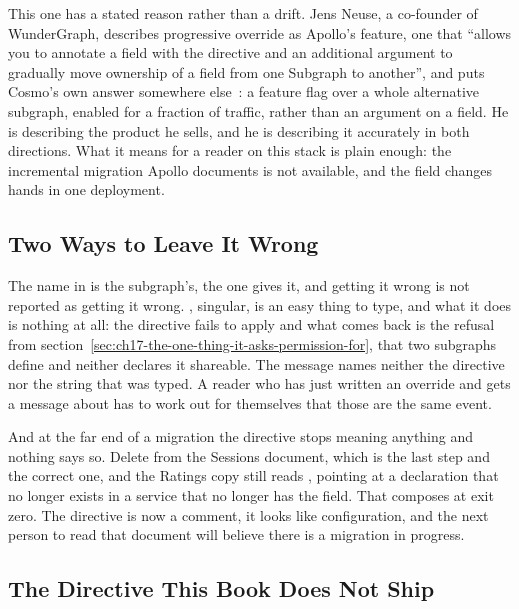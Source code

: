 %
This one has a stated reason rather than a drift. Jens Neuse, a co-founder of
WunderGraph, describes progressive override as Apollo's feature, one that
\enquote{allows you to annotate a field with the  directive
and an additional  argument to gradually move ownership of a field
from one Subgraph to another}, and puts Cosmo's own answer somewhere
else~\autocite{neuse2024featureflags}: a feature flag over a whole alternative
subgraph, enabled for a fraction of traffic, rather than an argument on a
field. He is describing the product he sells, and he is describing it
accurately in both directions. What it means for a reader on this stack is
plain enough: the incremental migration Apollo documents is not available, and
the field changes hands in one deployment.

\subsection{Two Ways to Leave It Wrong}

%
The name in  is the subgraph's, the one  gives it,
and getting it wrong is not reported as getting it wrong.
, singular, is an easy thing to type, and
what it does is nothing at all: the directive fails to apply and what comes
back is the refusal from
section~\ref{sec:ch17-the-one-thing-it-asks-permission-for}, that two subgraphs
define  and neither declares it shareable. The message names
neither the directive nor the string that was typed. A reader who has just
written an override and gets a message about  has to work out
for themselves that those are the same event.

%
And at the far end of a migration the directive stops meaning anything and
nothing says so. Delete  from the Sessions document, which is
the last step and the correct one, and the Ratings copy still reads
, pointing at a declaration that no longer
exists in a service that no longer has the field. That composes at exit zero.
The directive is now a comment, it looks like configuration, and the next
person to read that document will believe there is a migration in progress.

\subsection{The Directive This Book Does Not Ship}


